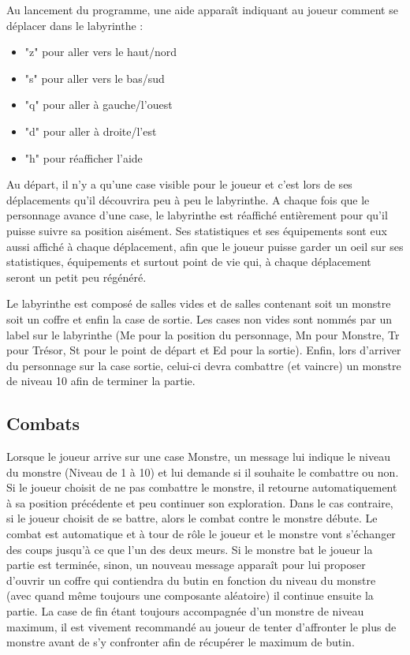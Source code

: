 \documentclass[a4paper]{article}
\begin{document}
Au lancement du programme, une aide apparaît indiquant au joueur comment se déplacer dans le labyrinthe :
\begin{itemize}
	\item "z" pour aller vers le haut/nord
	\item "s" pour aller vers le bas/sud
	\item "q" pour aller à gauche/l'ouest
	\item "d" pour aller à droite/l'est
	\item "h" pour réafficher l'aide
\end{itemize}

Au départ, il n'y a qu'une case visible pour le joueur et c'est lors de ses déplacements qu'il découvrira peu à peu le labyrinthe.
A chaque fois que le personnage avance d'une case, le labyrinthe est réaffiché entièrement pour qu'il puisse suivre sa position aisément.
Ses statistiques et ses équipements sont eux aussi affiché à chaque déplacement, afin que le joueur puisse garder un oeil sur ses statistiques, équipements et surtout point de vie qui, à chaque déplacement seront un petit peu régénéré.

Le labyrinthe est composé de salles vides et de salles contenant soit un monstre soit un coffre et enfin la case de sortie.
Les cases non vides sont nommés par un label sur le labyrinthe (Me pour la position du personnage, Mn pour Monstre, Tr pour Trésor, St pour le point de départ et Ed pour la sortie).
Enfin, lors d'arriver du personnage sur la case sortie, celui-ci devra combattre (et vaincre) un monstre de niveau 10 afin de terminer la partie.


    \subsection{Combats}

Lorsque le joueur arrive sur une case Monstre, un message lui indique le niveau du monstre (Niveau de 1 à 10) et lui demande si il souhaite le combattre ou non.
Si le joueur choisit de ne pas combattre le monstre, il retourne automatiquement à sa position précédente et peu continuer son exploration.
Dans le cas contraire, si le joueur choisit de se battre, alors le combat contre le monstre débute.
Le combat est automatique et à tour de rôle le joueur et le monstre vont s'échanger des coups jusqu'à ce que l'un des deux meurs.
Si le monstre bat le joueur la partie est terminée, sinon, un nouveau message apparaît pour lui proposer d'ouvrir un coffre qui contiendra du butin en fonction du niveau du monstre (avec quand même toujours une composante aléatoire) il continue ensuite la partie.
La case de fin étant toujours accompagnée d'un monstre de niveau maximum, il est vivement recommandé au joueur de tenter d'affronter le plus de monstre avant de s'y confronter afin de récupérer le maximum de butin.
\end{document}
